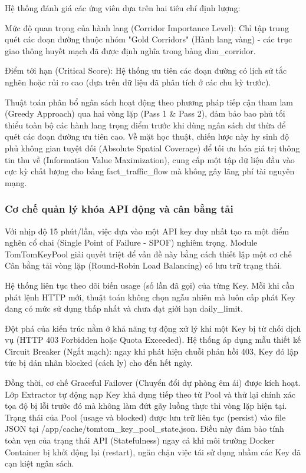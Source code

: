Hệ thống đánh giá các ứng viên dựa trên hai tiêu chí định lượng:


Mức độ quan trọng của hành lang (Corridor Importance Level): Chỉ tập trung quét các đoạn đường thuộc nhóm "Gold Corridors" (Hành lang vàng) - các trục giao thông huyết mạch đã được định nghĩa trong bảng dim\_corridor.


Điểm tới hạn (Critical Score): Hệ thống ưu tiên các đoạn đường có lịch sử tắc nghẽn hoặc rủi ro cao (dựa trên dữ liệu đã phân tích ở các chu kỳ trước).


Thuật toán phân bổ ngân sách hoạt động theo phương pháp tiếp cận tham lam (Greedy Approach) qua hai vòng lặp (Pass 1 \& Pass 2), đảm bảo bao phủ tối thiểu toàn bộ các hành lang trọng điểm trước khi dùng ngân sách dư thừa để quét các đoạn đường ưu tiên cao. Về mặt học thuật, chiến lược này hy sinh độ phủ không gian tuyệt đối (Absolute Spatial Coverage) để tối ưu hóa giá trị thông tin thu về (Information Value Maximization), cung cấp một tập dữ liệu đầu vào cực kỳ chất lượng cho bảng fact\_traffic\_flow mà không gây lãng phí tài nguyên mạng.


\subsubsection{Cơ chế quản lý khóa API động và cân bằng tải}
Với nhịp độ 15 phút/lần, việc dựa vào một API key duy nhất tạo ra một điểm nghẽn cổ chai (Single Point of Failure - SPOF) nghiêm trọng. Module TomTomKeyPool giải quyết triệt để vấn đề này bằng cách thiết lập một cơ chế Cân bằng tải vòng lặp (Round-Robin Load Balancing) có lưu trữ trạng thái.


Hệ thống liên tục theo dõi biến usage (số lần đã gọi) của từng Key. Mỗi khi cần phát lệnh HTTP mới, thuật toán không chọn ngẫu nhiên mà luôn cấp phát Key đang có mức sử dụng thấp nhất và chưa đạt giới hạn daily\_limit.


Đột phá của kiến trúc nằm ở khả năng tự động xử lý khi một Key bị từ chối dịch vụ (HTTP 403 Forbidden hoặc Quota Exceeded). Hệ thống áp dụng mẫu thiết kế Circuit Breaker (Ngắt mạch): ngay khi phát hiện chuỗi phản hồi 403, Key đó lập tức bị dán nhãn blocked (cách ly) cho đến hết ngày.


Đồng thời, cơ chế Graceful Failover (Chuyển đổi dự phòng êm ái) được kích hoạt. Lớp Extractor tự động nạp Key khả dụng tiếp theo từ Pool và thử lại chính xác tọa độ bị lỗi trước đó mà không làm đứt gãy luồng thực thi vòng lặp hiện tại. Trạng thái của Pool (usage và blocked) được lưu trữ liên tục (persist) vào file JSON tại /app/cache/tomtom\_key\_pool\_state.json. Điều này đảm bảo tính toàn vẹn của trạng thái API (Statefulness) ngay cả khi môi trường Docker Container bị khởi động lại (restart), ngăn chặn việc tái sử dụng nhầm các Key đã cạn kiệt ngân sách.


